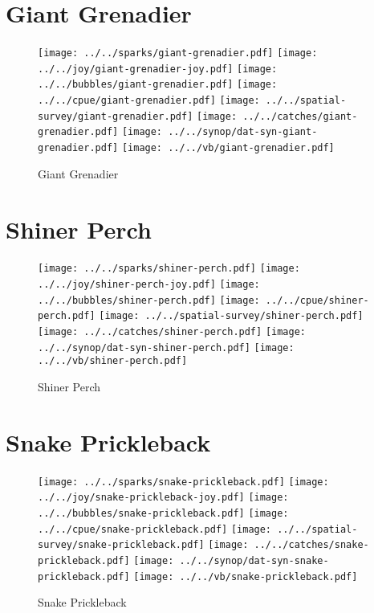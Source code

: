 \section{Giant Grenadier}

\begin{figure}[htbp]
\centering
\texttt{[image: ../../sparks/giant-grenadier.pdf]}
\texttt{[image: ../../joy/giant-grenadier-joy.pdf]}
\texttt{[image: ../../bubbles/giant-grenadier.pdf]}
\texttt{[image: ../../cpue/giant-grenadier.pdf]}
\texttt{[image: ../../spatial-survey/giant-grenadier.pdf]}
\texttt{[image: ../../catches/giant-grenadier.pdf]}
\texttt{[image: ../../synop/dat-syn-giant-grenadier.pdf]}
\texttt{[image: ../../vb/giant-grenadier.pdf]}
\caption{Giant Grenadier}
\end{figure}
\clearpage
\section{Shiner Perch}

\begin{figure}[htbp]
\centering
\texttt{[image: ../../sparks/shiner-perch.pdf]}
\texttt{[image: ../../joy/shiner-perch-joy.pdf]}
\texttt{[image: ../../bubbles/shiner-perch.pdf]}
\texttt{[image: ../../cpue/shiner-perch.pdf]}
\texttt{[image: ../../spatial-survey/shiner-perch.pdf]}
\texttt{[image: ../../catches/shiner-perch.pdf]}
\texttt{[image: ../../synop/dat-syn-shiner-perch.pdf]}
\texttt{[image: ../../vb/shiner-perch.pdf]}
\caption{Shiner Perch}
\end{figure}
\clearpage
\section{Snake Prickleback}

\begin{figure}[htbp]
\centering
\texttt{[image: ../../sparks/snake-prickleback.pdf]}
\texttt{[image: ../../joy/snake-prickleback-joy.pdf]}
\texttt{[image: ../../bubbles/snake-prickleback.pdf]}
\texttt{[image: ../../cpue/snake-prickleback.pdf]}
\texttt{[image: ../../spatial-survey/snake-prickleback.pdf]}
\texttt{[image: ../../catches/snake-prickleback.pdf]}
\texttt{[image: ../../synop/dat-syn-snake-prickleback.pdf]}
\texttt{[image: ../../vb/snake-prickleback.pdf]}
\caption{Snake Prickleback}
\end{figure}
\clearpage
